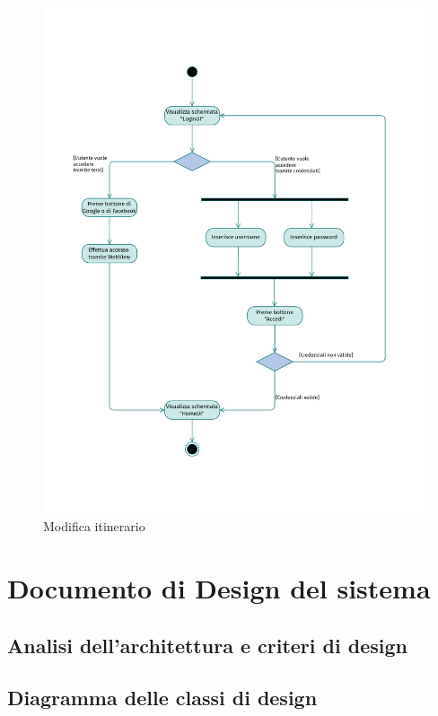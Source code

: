 \documentclass{natourDoc}
\begin{document}
\newpage
\begin{figure}[!htbp]
	\centering
	\includegraphics[width=\textwidth, page=19]{./diagrams/activity.pdf}
	\caption{Modifica itinerario}
\end{figure}
\FloatBarrier


\newpage
\section{Documento di Design del sistema}
\subsection{Analisi dell'architettura e criteri di design}

\begin{figure}[!htbp]
	\centering
	 
\end{figure}

\newpage
\subsection{Diagramma delle classi di design}
\end{document}

